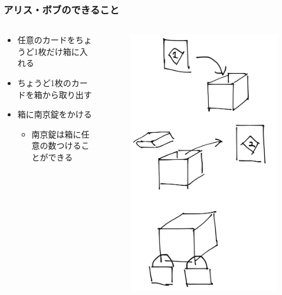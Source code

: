 \begin{frame}
  \frametitle{アリス・ボブのできること}

  \pause
  \begin{columns}
    \begin{column}{0.6\textwidth}
      \begin{itemize}
        \item<+-> 任意のカードをちょうど1枚だけ箱に入れる

        \item<+-> ちょうど1枚のカードを箱から取り出す

        \item<+-> 箱に南京錠をかける
        \begin{itemize}
          \item 南京錠は箱に任意の数つけることができる
        \end{itemize}
      \end{itemize}
    \end{column}
    \begin{column}{0.4\textwidth}
      \begin{figure}[h]
        \includegraphics[height=0.8\textheight]{img/we_can.png}

\end{figure}
\end{column}
\end{columns}
\end{frame}
